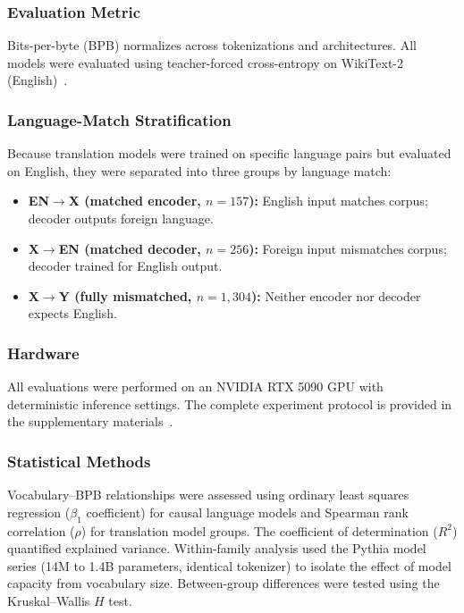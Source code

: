 \documentclass[11pt]{article}
\begin{document}
\subsubsection{Evaluation Metric}

Bits-per-byte (BPB) normalizes across tokenizations and architectures. All models were evaluated using teacher-forced cross-entropy on WikiText-2 (English)~\cite{berger1971}.

\subsubsection{Language-Match Stratification}

Because translation models were trained on specific language pairs but evaluated on English, they were separated into three groups by language match:
\begin{itemize}
    \item \textbf{EN$\to$X (matched encoder, $n = 157$):} English input matches corpus; decoder outputs foreign language.
    \item \textbf{X$\to$EN (matched decoder, $n = 256$):} Foreign input mismatches corpus; decoder trained for English output.
    \item \textbf{X$\to$Y (fully mismatched, $n = 1{,}304$):} Neither encoder nor decoder expects English.
\end{itemize}

\subsubsection{Hardware}

All evaluations were performed on an NVIDIA RTX 5090 GPU with deterministic inference settings. The complete experiment protocol is provided in the supplementary materials~\cite{whitmer2026rlf_code}.

\subsubsection{Statistical Methods}

Vocabulary--BPB relationships were assessed using ordinary least squares regression ($\beta_1$ coefficient) for causal language models and Spearman rank correlation ($\rho$) for translation model groups. The coefficient of determination ($R^2$) quantified explained variance. Within-family analysis used the Pythia model series (14M to 1.4B parameters, identical tokenizer) to isolate the effect of model capacity from vocabulary size. Between-group differences were tested using the Kruskal--Wallis $H$ test.
\end{document}
